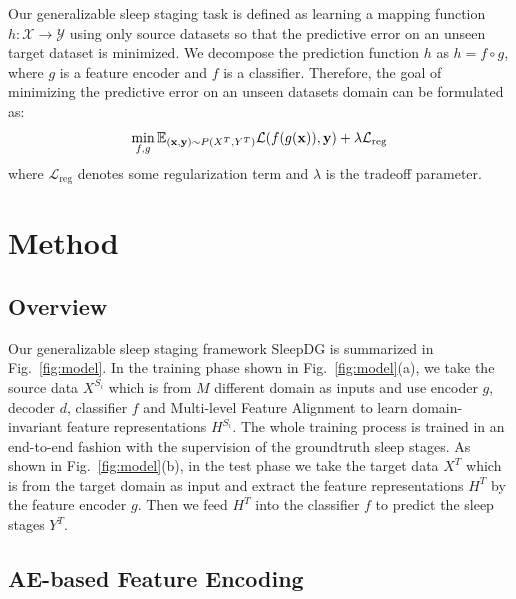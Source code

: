 \documentclass[letterpaper]{article} %
\begin{document}
	Our generalizable sleep staging task is defined as learning a mapping function $h:\mathcal{X} \rightarrow \mathcal{Y}$ using only source datasets so that the predictive error on an unseen target dataset is minimized. 
	We decompose the prediction function $h$ as $h = f \circ g$, where $g$ is a feature encoder and $f$ is a classifier.
	Therefore, the goal of minimizing the predictive error on an unseen datasets domain can be formulated as:
	\begin{equation}
		\label{eq:goal}	
		\small
		\min_{f,g} \mathbb{E}_{(\mathrm{\mathbf{x}}, \mathrm{\mathbf{y}}) \sim P(X^T, Y^T)} \mathcal{L}(f(g(\mathrm{\mathbf{x}})), \mathrm{\mathbf{y}}) + \lambda \mathcal{L}_{\mathrm{reg}}
	\end{equation}
	where $\mathcal{L}_{\mathrm{reg}}$ denotes some regularization term and $\lambda$ is the tradeoff parameter.
	
	\section{Method}
	\subsection{Overview}
	
	
	Our generalizable sleep staging framework SleepDG is summarized in Fig.~\ref{fig:model}.
	In the training phase shown in Fig.~\ref{fig:model}(a), we take the source data $X^{S_i}$ which is from $M$ different domain as inputs and use encoder $g$, decoder $d$, classifier $f$ and Multi-level Feature Alignment to learn domain-invariant feature representations $H^{S_i}$.
	The whole training process is trained in an end-to-end fashion with the supervision of the groundtruth sleep stages.
	As shown in Fig.~\ref{fig:model}(b), in the test phase we take the target data $X^T$ which is from the target domain as input and extract the feature representations $H^T$ by the feature encoder $g$.
	Then we feed $H^T$ into the classifier $f$ to predict the sleep stages $Y^T$.
	
	\subsection{AE-based Feature Encoding} 
	
\end{document}
